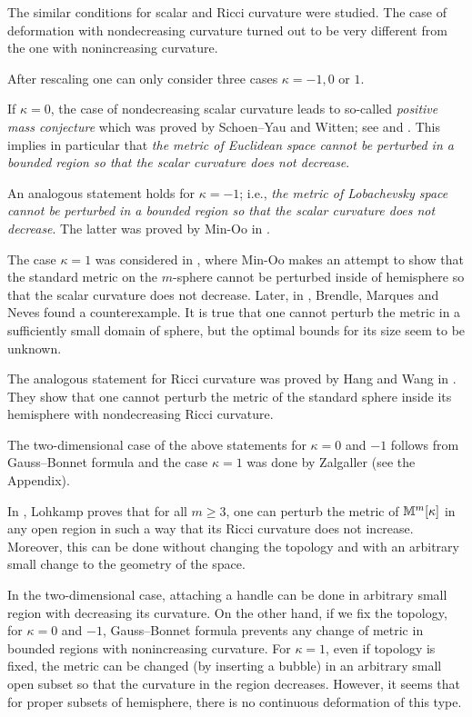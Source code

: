 \documentclass[oneside,a4paper]{article}
\begin{document}
The similar conditions for scalar and Ricci curvature were studied.
The case of deformation with nondecreasing  curvature turned out to be very different from the one with
nonincreasing curvature. 

After rescaling one can only consider three cases $\kappa=-1,0$ or $1$.

If $\kappa=0$,
the case of nondecreasing scalar curvature leads to so-called
\emph{positive mass conjecture} which was proved by Schoen--Yau and 
Witten;
see
\cite{schoen-yau} and 
\cite{witten}.
This implies in particular that
\textit{the metric of Euclidean space cannot be perturbed in a bounded region so that the scalar curvature does not decrease}.

An analogous statement holds for $\kappa=-1$;
i.e., \textit{the metric of Lobachevsky space cannot be perturbed in a bounded region so that the scalar curvature does not decrease}.
The latter was proved by Min-Oo in \cite{oo-lob}.

The case $\kappa=1$ was considered in \cite{oo},
where Min-Oo  makes an attempt to show that the standard metric on the $m$-sphere
cannot be perturbed inside of hemisphere so that the scalar curvature does
not decrease.
Later, in \cite{brendle-marques-neves}, Brendle, Marques and Neves found a counterexample.
It is true that one cannot perturb the metric in a sufficiently small domain of sphere,
but the optimal bounds for its size seem to be unknown.

The analogous statement for Ricci curvature was proved by Hang and Wang in \cite{hang-wang}.
They show that one cannot perturb the metric of the standard sphere inside its hemisphere with nondecreasing Ricci curvature.

The two-dimensional case of the above statements for $\kappa=0$ and $-1$ follows from Gauss--Bonnet formula
and the case $\kappa=1$ was done by Zalgaller (see the Appendix).


In \cite{lohkamp-Ricc}, Lohkamp proves that
for all $m\ge3$,
one can perturb the metric of $\mathbb{M}^m[\kappa]$ in any open region
in such a way that its Ricci curvature does not increase.
Moreover, this can be done without changing the topology 
and with an arbitrary small change to the geometry of the space.

In the two-dimensional case, attaching a handle can be done in arbitrary small region with decreasing its curvature.
On the other hand, if we fix the topology, for $\kappa=0$ and $-1$,
Gauss--Bonnet formula prevents any change of metric in bounded regions
with nonincreasing curvature.
For $\kappa=1$, even if topology is fixed,
the metric can be changed (by inserting a bubble) in an arbitrary small open subset
so that the curvature in the region decreases. However, it seems that for proper
subsets of hemisphere, there is no continuous deformation of this type.
\end{document}
